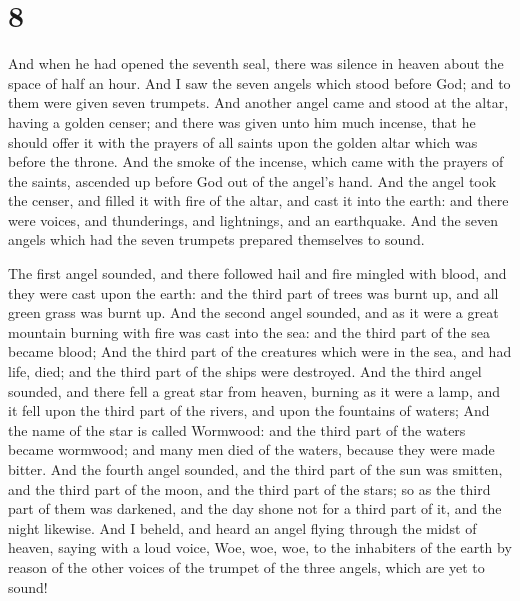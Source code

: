 \hypertarget{section-7}{%
\section{8}\label{section-7}}

 And when he had opened the seventh seal, there was
silence in heaven about the space of half an hour.  And I
saw the seven angels which stood before God; and to them were given
seven trumpets.  And another angel came and stood at the
altar, having a golden censer; and there was given unto him much
incense, that he should offer it with the prayers of all saints upon the
golden altar which was before the throne.  And the smoke
of the incense, which came with the prayers of the saints, ascended up
before God out of the angel's hand.  And the angel took
the censer, and filled it with fire of the altar, and cast it into the
earth: and there were voices, and thunderings, and lightnings, and an
earthquake.  And the seven angels which had the seven
trumpets prepared themselves to sound.

 The first angel sounded, and there followed hail and fire
mingled with blood, and they were cast upon the earth: and the third
part of trees was burnt up, and all green grass was burnt up.
 And the second angel sounded, and as it were a great
mountain burning with fire was cast into the sea: and the third part of
the sea became blood;  And the third part of the creatures
which were in the sea, and had life, died; and the third part of the
ships were destroyed.  And the third angel sounded, and
there fell a great star from heaven, burning as it were a lamp, and it
fell upon the third part of the rivers, and upon the fountains of
waters;  And the name of the star is called Wormwood: and
the third part of the waters became wormwood; and many men died of the
waters, because they were made bitter.  And the fourth
angel sounded, and the third part of the sun was smitten, and the third
part of the moon, and the third part of the stars; so as the third part
of them was darkened, and the day shone not for a third part of it, and
the night likewise.  And I beheld, and heard an angel
flying through the midst of heaven, saying with a loud voice, Woe, woe,
woe, to the inhabiters of the earth by reason of the other voices of the
trumpet of the three angels, which are yet to sound!

